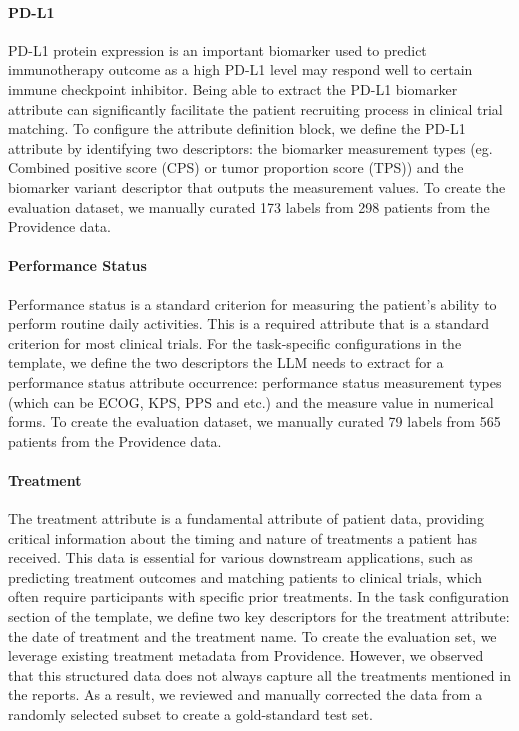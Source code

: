 \paragraph{PD-L1} PD-L1 protein expression is an important biomarker used to predict immunotherapy outcome as a high PD-L1 level may respond well to certain immune checkpoint inhibitor. Being able to extract the PD-L1 biomarker attribute can significantly facilitate the patient recruiting process in clinical trial matching. To configure the attribute definition block, we define the PD-L1 attribute by identifying two descriptors: the biomarker measurement types (eg. Combined positive score (CPS) or tumor proportion score (TPS)) and the biomarker variant descriptor that outputs the measurement values. To create the evaluation dataset, we manually curated 173 labels from 298 patients from the Providence data. 


\paragraph{Performance Status} 
Performance status is a standard criterion for measuring the patient's ability to perform routine daily activities. This is a required attribute that is a standard criterion for most clinical trials. For the task-specific configurations in the template, we define the two descriptors the \ac{LLM} needs to extract for a performance status attribute occurrence: performance status measurement types (which can be ECOG, KPS, PPS and etc.) and the measure value in numerical forms. To create the evaluation dataset, we manually curated 79 labels from 565 patients from the Providence data.  














\paragraph{Treatment}
The treatment attribute is a fundamental attribute of patient data, providing critical information about the timing and nature of treatments a patient has received. This data is essential for various downstream applications, such as predicting treatment outcomes and matching patients to clinical trials, which often require participants with specific prior treatments. In the task configuration section of the template, we define two key descriptors for the treatment attribute: the date of treatment and the treatment name. To create the evaluation set, we leverage existing treatment metadata from Providence. However, we observed that this structured data does not always capture all the treatments mentioned in the reports. As a result, we reviewed and manually corrected the data from a randomly selected subset to create a gold-standard test set.



